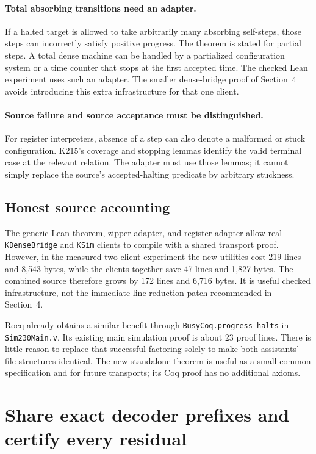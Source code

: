 \documentclass[11pt,letterpaper]{article}
\newcommand{\code}[1]{\texttt{#1}}
\begin{document}
\paragraph{Total absorbing transitions need an adapter.}
If a halted target is allowed to take arbitrarily many absorbing self-steps, those
steps can incorrectly satisfy positive progress. The theorem is stated for partial
steps. A total dense machine can be handled by a partialized configuration system
or a time counter that stops at the first accepted time. The checked Lean experiment
uses such an adapter. The smaller dense-bridge proof of Section~4 avoids introducing
this extra infrastructure for that one client.

\paragraph{Source failure and source acceptance must be distinguished.}
For register interpreters, absence of a step can also denote a malformed or stuck
configuration. K215's coverage and stopping lemmas identify the valid terminal
case at the relevant relation. The adapter must use those lemmas; it cannot simply
replace the source's accepted-halting predicate by arbitrary stuckness.

\subsection{Honest source accounting}

The generic Lean theorem, zipper adapter, and register adapter allow real
\code{KDenseBridge} and \code{KSim} clients to compile with a shared transport proof.
However, in the measured two-client experiment the new utilities cost 219 lines and
8,543 bytes, while the clients together save 47 lines and 1,827 bytes. The combined
source therefore grows by 172 lines and 6,716 bytes. It is useful checked infrastructure,
not the immediate line-reduction patch recommended in Section~4.

Rocq already obtains a similar benefit through \code{BusyCoq.progress\_halts} in
\code{Sim230Main.v}. Its existing main simulation proof is about 23 proof lines.
There is little reason to replace that successful factoring solely to make both
assistants' file structures identical. The new standalone theorem is useful as a
small common specification and for future transports; its Coq proof has no additional
axioms.

\section{Share exact decoder prefixes and certify every residual}
\end{document}
